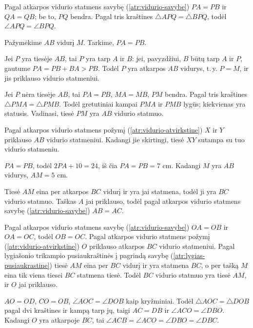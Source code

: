 \documentclass[12pt,a4paper,reqno]{amsart}
\theoremstyle{plain}\newtheorem{theorem}{Teorema}[section]
\theoremstyle{definition}
\theoremstyle{remark}\newtheorem{remark}[theorem]{Pastaba}\newtheorem*{remark*}{Pastaba}
\theoremstyle{definition}\newtheorem*{problem*}{Uždavinys}
\begin{document}
\begin{solution}[\ref{uzd:vidurio-savybe-02}] Pagal atkarpos vidurio statmens savybę (\ref{atr:vidurio-savybe}) $PA=PB$ ir $QA=QB$; be to, $PQ$ bendra. Pagal tris kraštines $\triangle APQ=\triangle BPQ$, todėl $\angle APQ=\angle BPQ$. \end{solution}
\begin{solution}[\ref{atr:vidurio-atvirkstine}] Pažymėkime $AB$ vidurį $M$. Tarkime, $PA=PB$.\par
Jei $P$ yra tiesėje $AB$, tai $P$ yra tarp $A$ ir $B$: jei, pavyzdžiui, $B$ būtų tarp $A$ ir $P$, gautume $PA=PB+BA>PB$. Todėl $P$ yra atkarpos $AB$ vidurys, t.\,y. $P=M$, ir jis priklauso vidurio statmeniui.\par
Jei $P$ nėra tiesėje $AB$, tai $PA=PB$, $MA=MB$, $PM$ bendra. Pagal tris kraštines $\triangle PMA=\triangle PMB$. Todėl gretutiniai kampai $PMA$ ir $PMB$ lygūs; kiekvienas yra statusis. Vadinasi, tiesė $PM$ yra $AB$ vidurio statmuo. \end{solution}
\begin{solution}[\ref{uzd:vidurio-atvirkstine-01}] Pagal atkarpos vidurio statmens požymį (\ref{atr:vidurio-atvirkstine}) $X$ ir $Y$ priklauso $AB$ vidurio statmeniui. Kadangi jie skirtingi, tiesė $XY$ sutampa su tuo vidurio statmeniu. \end{solution}
\begin{solution}[\ref{uzd:vidurio-taikymas-01}] $PA=PB$, todėl $2PA+10=24$, iš čia $PA=PB=7$ cm. Kadangi $M$ yra $AB$ vidurys, $AM=5$ cm. \end{solution}
\begin{solution}[\ref{uzd:vidurio-taikymas-02}] Tiesė $AM$ eina per atkarpos $BC$ vidurį ir yra jai statmena, todėl ji yra $BC$ vidurio statmuo. Taškas $A$ jai priklauso, todėl pagal atkarpos vidurio statmens savybę (\ref{atr:vidurio-savybe}) $AB=AC$. \end{solution}
\begin{solution}[\ref{uzd:vidurio-taikymas-03}] Pagal atkarpos vidurio statmens savybę (\ref{atr:vidurio-savybe}) $OA=OB$ ir $OA=OC$, todėl $OB=OC$. Pagal atkarpos vidurio statmens požymį (\ref{atr:vidurio-atvirkstine}) $O$ priklauso atkarpos $BC$ vidurio statmeniui. Pagal lygiašonio trikampio pusiaukraštinės į pagrindą savybę (\ref{atr:lygias-pusiaukrastine}) tiesė $AM$ eina per $BC$ vidurį ir yra statmena $BC$, o per tašką $M$ eina tik viena tiesei $BC$ statmena tiesė. Todėl $BC$ vidurio statmuo yra tiesė $AM$, ir $O$ jai priklauso. \end{solution}
\begin{solution}[\ref{uzd:savikontrole-01}] $AO=OD$, $CO=OB$, $\angle AOC=\angle DOB$ kaip kryžminiai. Todėl $\triangle AOC=\triangle DOB$ pagal dvi kraštines ir kampą tarp jų, taigi $AC=DB$ ir $\angle ACO=\angle DBO$. Kadangi $O$ yra atkarpoje $BC$, tai $\angle ACB=\angle ACO=\angle DBO=\angle DBC$. \end{solution}
\end{document}
